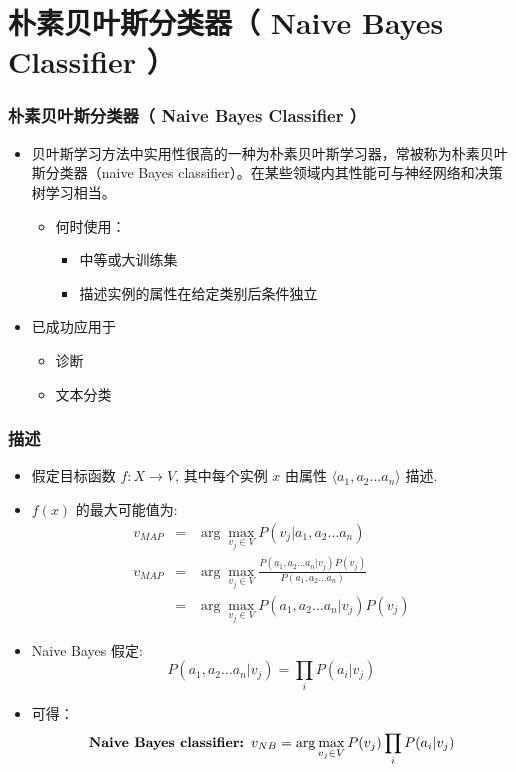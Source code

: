 \documentclass{beamer}
\begin{document}
\section{朴素贝叶斯分类器（ Naive Bayes Classifier ）}
\label{sec-8}
\begin{frame}
\frametitle{朴素贝叶斯分类器（ Naive Bayes Classifier ）}
\label{sec-8-1}

\begin{itemize}
\item 贝叶斯学习方法中实用性很高的一种为朴素贝叶斯学习器，常被称为朴素贝叶斯分类器（naive Bayes classifier）。在某些领域内其性能可与神经网络和决策树学习相当。
\begin{itemize}
\item 何时使用：
\begin{itemize}
\item 中等或大训练集
\item 描述实例的属性在给定类别后条件独立
\end{itemize}
\end{itemize}
\item 已成功应用于
\begin{itemize}
\item 诊断
\item 文本分类
\end{itemize}
\end{itemize}
\end{frame}
\begin{frame}
\frametitle{描述}
\label{sec-8-2}


\begin{itemize}
\item 假定目标函数 $f: X \rightarrow V$, 其中每个实例 $x$ 由属性 $\langle a_{1}, a_{2} \ldots a_{n} \rangle$ 描述.
\item $f(x)$ 的最大可能值为:
     \begin{eqnarray}
     v_{MAP} &= &\arg \max_{v_{j} \in V} P(v_{j} | a_{1}, a_{2} \ldots a_{n})  \nonumber \\ 
     v_{MAP} &= &\arg \max_{v_{j} \in V} \frac{P(a_{1}, a_{2} \ldots a_{n}|v_{j})
     P(v_{j})}{P(a_{1}, a_{2} \ldots a_{n})} \nonumber \\ 
     &= &\arg \max_{v_{j} \in V} P(a_{1}, a_{2} \ldots a_{n}|v_{j}) P(v_{j}) \nonumber
     \end{eqnarray}
\item Naive Bayes 假定:
   \[ P(a_{1}, a_{2} \ldots a_{n}|v_{j}) = \prod_{i} P(a_{i} | v_{j}) \]
\item 可得： 
   \[\mbox{\bf Naive Bayes classifier: } v_{NB} = \arg \max_{v_{j} \in V} P(v_{j})\prod_{i} P(a_{i} | v_{j}) \]
\end{itemize}
\end{frame}
\end{document}
